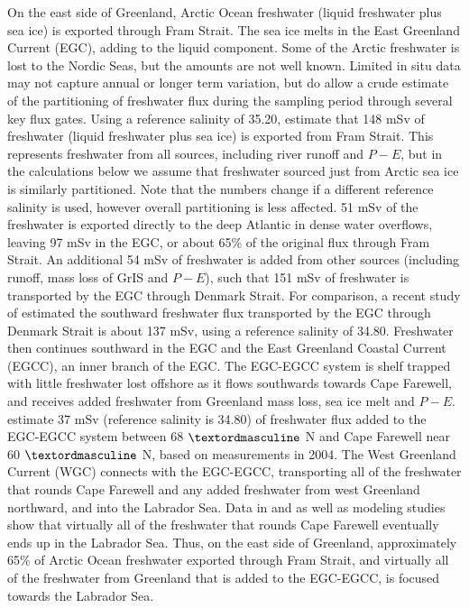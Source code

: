 On the east side of Greenland, Arctic Ocean freshwater (liquid freshwater plus sea ice) is exported through Fram Strait.  The sea ice melts in the East Greenland Current (EGC), adding to the liquid component.  Some of the Arctic freshwater is lost to the Nordic Seas, but the amounts are not well known.  Limited in situ data may not capture annual or longer term variation, but do allow a crude estimate of the partitioning of freshwater flux during the sampling period through several key flux gates.  Using a reference salinity of 35.20, \citet{dickson2007current} estimate that 148 mSv of freshwater (liquid freshwater plus sea ice) is exported from Fram Strait.   This represents freshwater from all sources, including river runoff and $P-E$, but in the calculations below we assume that freshwater sourced just from Arctic sea ice is similarly partitioned.   Note that the numbers change if a different reference salinity is used, however overall partitioning is less affected.  51 mSv of the freshwater is exported directly to the deep Atlantic in dense water overflows, leaving 97 mSv in the EGC, or about 65\% of the original flux through Fram Strait.   An additional 54 mSv of freshwater is added from other sources (including runoff, mass loss of GrIS and $P-E$), such that 151 mSv of freshwater is transported by the EGC through Denmark Strait.  For comparison, a recent study of \citet{vaage2013revised} estimated the southward freshwater flux transported by the EGC through Denmark Strait is about 137 mSv, using a reference salinity of 34.80.  Freshwater then continues southward in the EGC and the East Greenland Coastal Current (EGCC), an inner branch of the EGC.  The EGC-EGCC system is shelf trapped with little freshwater lost offshore as it flows southwards towards Cape Farewell, and receives added freshwater from Greenland mass loss, sea ice melt and $P-E$.  \citet{sutherland2008east} estimate 37 mSv (reference salinity is 34.80) of freshwater flux added to the EGC-EGCC system between 68 $\textordmasculine$ N and Cape Farewell near 60 $\textordmasculine$ N, based on measurements in 2004.  The West Greenland Current (WGC) connects with the EGC-EGCC, transporting all of the freshwater that rounds Cape Farewell and any added freshwater from west Greenland northward, and into the Labrador Sea.   Data in \citet{myers2007interdecadal,myers2009structure} and \citet{rykova2015seasonal} as well as modeling studies \cite[]{kawasaki2014effect,saenko2014role} show that virtually all of the freshwater that rounds Cape Farewell eventually ends up in the Labrador Sea.  Thus, on the east side of Greenland, approximately 65\% of Arctic Ocean freshwater exported through Fram Strait, and virtually all of the freshwater from Greenland that is added to the EGC-EGCC, is focused towards the Labrador Sea.  

